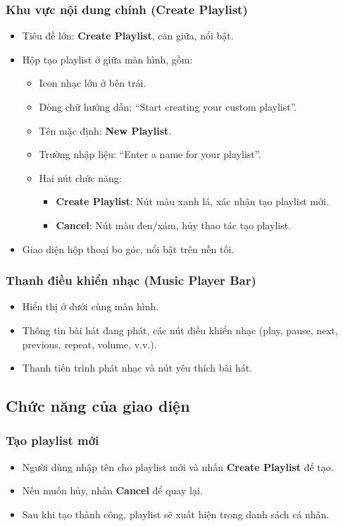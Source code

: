 \documentclass{book}
\begin{document}
\subsubsection{Khu vực nội dung chính (Create Playlist)}
\begin{itemize}
    \item Tiêu đề lớn: \textbf{Create Playlist}, căn giữa, nổi bật.
    \item Hộp tạo playlist ở giữa màn hình, gồm:
    \begin{itemize}
        \item Icon nhạc lớn ở bên trái.
        \item Dòng chữ hướng dẫn: “Start creating your custom playlist”.
        \item Tên mặc định: \textbf{New Playlist}.
        \item Trường nhập liệu: “Enter a name for your playlist”.
        \item Hai nút chức năng:
        \begin{itemize}
            \item \textbf{Create Playlist}: Nút màu xanh lá, xác nhận tạo playlist mới.
            \item \textbf{Cancel}: Nút màu đen/xám, hủy thao tác tạo playlist.
        \end{itemize}
    \end{itemize}
    \item Giao diện hộp thoại bo góc, nổi bật trên nền tối.
\end{itemize}

\subsubsection{Thanh điều khiển nhạc (Music Player Bar)}
\begin{itemize}
    \item Hiển thị ở dưới cùng màn hình.
    \item Thông tin bài hát đang phát, các nút điều khiển nhạc (play, pause, next, previous, repeat, volume, v.v.).
    \item Thanh tiến trình phát nhạc và nút yêu thích bài hát.
\end{itemize}

\subsection{Chức năng của giao diện}

\subsubsection{Tạo playlist mới}
\begin{itemize}
    \item Người dùng nhập tên cho playlist mới và nhấn \textbf{Create Playlist} để tạo.
    \item Nếu muốn hủy, nhấn \textbf{Cancel} để quay lại.
    \item Sau khi tạo thành công, playlist sẽ xuất hiện trong danh sách cá nhân.
\end{itemize}
\end{document}
